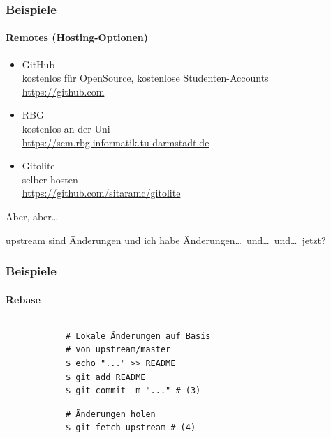 \documentclass[]{beamer}
\begin{document}
\begin{frame}
	\frametitle{Beispiele}
	\framesubtitle{Remotes (Hosting-Optionen)}
	\begin{itemize}
		\item
			GitHub\\
			kostenlos für OpenSource, kostenlose Studenten-Accounts\\
			\url{https://github.com}
		\item
			RBG\\
			kostenlos an der Uni\\
			\url{https://scm.rbg.informatik.tu-darmstadt.de}
		\item
			Gitolite\\
			selber hosten\\
			\url{https://github.com/sitaramc/gitolite}
	\end{itemize}
\end{frame}

\begin{frame}
	\fontsize{30}{10}\selectfont Aber, aber\ldots
	\vspace*{0.5cm}

	\fontsize{20}{10}\selectfont upstream sind Änderungen und ich habe
	Änderungen\ldots\ und\ldots\ und\ldots\ jetzt?
\end{frame}

\begin{frame}[fragile]
	\frametitle{Beispiele}
	\framesubtitle{Rebase}
	\begin{columns}[T]
		\begin{column}{7.5cm}
			\begin{verbatim}
			# Lokale Änderungen auf Basis
			# von upstream/master
			$ echo "..." >> README
			$ git add README
			$ git commit -m "..." # (3)
			\end{verbatim}

			\begin{verbatim}
			# Änderungen holen
			$ git fetch upstream # (4)
			\end{verbatim}
		\end{column}
		\begin{column}{2.5cm}
		\end{column}
	\end{columns}
\end{frame}
\end{document}
